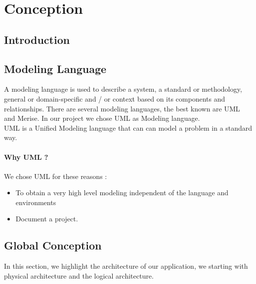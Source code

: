 
	\chapter{Conception}

	
	\section{Introduction}

	\section{Modeling Language}
		A modeling language is used to describe a system, a standard or methodology, general or domain-specific and / or context based on its components and relationships.
	There are several modeling languages, the best known are UML and Merise. In our project we chose UML as Modeling language.
	\\
	UML is a Unified Modeling language that can can model a problem in a standard way.
	\\
	\\
	\textbf{Why UML ?}
	\\
	\\
	We chose UML for these reasons : 
	\begin{itemize}
	\item To obtain a very high level modeling independent of the language and environments
	\item Document a project. 
	\end{itemize}
	
	\section{Global Conception}
	In this section, we highlight the architecture of our application, we starting  with physical architecture and the logical architecture.
	
	\clearpage
	\newpage
